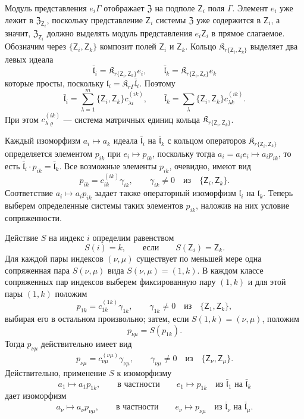 \documentclass[11pt]{article}
\begin{document}
Модуль представления \(e_i\Gamma\) отображает \(\mathfrak Z\) на подполе \(\mathsf{Z}_i\) поля \(\Gamma\). Элемент \(e_i\) уже лежит в \(\mathfrak Z_{\mathsf{Z}_i}\), поскольку представление \(\mathsf{Z}_i\) системы \(\mathfrak Z\) уже содержится в \(\mathsf{Z}_i\), а значит, \(\mathfrak Z_{\mathsf{Z}_i}\) должно выделять модуль представления \(e_i\mathsf{Z}_i\) в прямое слагаемое. Обозначим через \(\{\mathsf{Z}_i,\mathsf{Z}_k\}\) композит полей \(\mathsf{Z}_i\) и \(\mathsf{Z}_k\). Кольцо \(\mathfrak K_{r\{\mathsf{Z}_i,\mathsf{Z}_k\}}\) выделяет два левых идеала
\[
\bar{\mathfrak l}_i=\mathfrak K_{r\{\mathsf{Z}_i,\mathsf{Z}_k\}}e_i,\qquad
\bar{\mathfrak l}_k=\mathfrak K_{r\{\mathsf{Z}_i,\mathsf{Z}_k\}}e_k
\]
которые просты, поскольку \(\mathfrak l_i=\mathfrak K_{r\Gamma}\bar{\mathfrak l}_i\). Поэтому
\[
\bar{\mathfrak l}_i=\sum_{\lambda=1}^m\{\mathsf{Z}_i,\mathsf{Z}_k\}c_{\lambda i}^{(ik)},\qquad
\bar{\mathfrak l}_k=\sum_{\lambda}\{\mathsf{Z}_i,\mathsf{Z}_k\}c_{\lambda k}^{(ik)}.
\]
При этом \(c_{\lambda\varrho}^{(ik)}\) --- система матричных единиц кольца \(\mathfrak K_{r\{\mathsf{Z}_i,\mathsf{Z}_k\}}\).

Каждый изоморфизм \(a_i\mapsto a_k\) идеала \(\bar{\mathfrak l}_i\) на \(\bar{\mathfrak l}_k\) с кольцом операторов \(\mathfrak K_{r\{\mathsf{Z}_i,\mathsf{Z}_k\}}\) определяется элементом \(p_{ik}\) при \(e_i\mapsto p_{ik}\), поскольку тогда \(a_i=a_ie_i\mapsto a_ip_{ik}\), то есть \(\bar{\mathfrak l}_i\cdot p_{ik}=\bar{\mathfrak l}_k\). Все возможные элементы \(p_{ik}\), очевидно, имеют вид
\[
p_{ik}=c_{ik}^{(ik)}\gamma_{ik},\qquad \gamma_{ik}\ne0\quad\text{из}\quad \{\mathsf{Z}_i,\mathsf{Z}_k\}.
\]
Соответствие \(a_i\mapsto a_ip_{ik}\) задает также операторный изоморфизм \(\mathfrak l_i\) на \(\mathfrak l_k\). Теперь выберем определенные системы таких элементов \(p_{ik}\), наложив на них условие сопряженности.

Действие \(S\) на индекс \(i\) определим равенством
\[
S(i)=k,\qquad\text{если}\qquad S(\mathsf{Z}_i)=\mathsf{Z}_k.
\]
Для каждой пары индексов \((\nu,\mu)\) существует по меньшей мере одна сопряженная пара \(S(\nu,\mu)\) вида \(S(\nu,\mu)=(1,k)\). В каждом классе сопряженных пар индексов выберем фиксированную пару \((1,k)\) и для этой пары \((1,k)\) положим
\[
p_{1k}=c_{1k}^{(1k)}\gamma_{1k},\qquad \gamma_{1k}\ne0\quad\text{из}\quad \{\mathsf{Z}_1,\mathsf{Z}_k\},
\]
выбирая его в остальном произвольно; затем, если \(S(1,k)=(\nu,\mu)\), положим
\[
p_{\nu\mu}=S(p_{1k}).
\]
Тогда \(p_{\nu\mu}\) действительно имеет вид
\[
p_{\nu\mu}=c_{\nu\mu}^{(\nu\mu)}\gamma_{\nu\mu},\qquad
\gamma_{\nu\mu}\ne0\quad\text{из}\quad \{\mathsf{Z}_\nu,\mathsf{Z}_\mu\}.
\]
Действительно, применение \(S\) к изоморфизму
\[
a_1\mapsto a_1p_{1k},\qquad\text{в частности}\qquad e_1\mapsto p_{1k}
\quad\text{из }\bar{\mathfrak l}_1\text{ на }\bar{\mathfrak l}_k
\]
дает изоморфизм
\[
a_\nu\mapsto a_\nu p_{\nu\mu},\qquad\text{в частности}\qquad e_\nu\mapsto p_{\nu\mu}
\quad\text{из }\bar{\mathfrak l}_\nu\text{ на }\bar{\mathfrak l}_\mu.
\]
\end{document}
